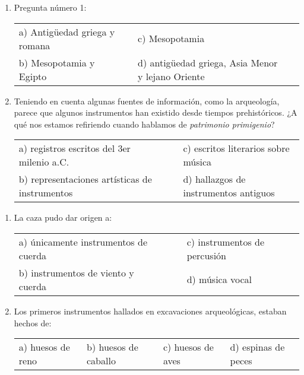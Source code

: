 \documentclass[letterpaper,12pt,notitlepage,spanish]{article}
\begin{document}
\begin{ejercicio}[]
	\begin{enumerate}[1.-]
%
% 
		\item
		Pregunta número 1:\par
%
%
	\begin{tabular}{llll}
		a) Antigüedad griega y romana & & c) Mesopotamia & \\
		b) Mesopotamia y Egipto & & d) antigüedad griega, Asia Menor y lejano Oriente
	\end{tabular}
%	
%
%
\item Teniendo en cuenta algunas fuentes de información, como la arqueología, parece que algunos instrumentos han existido desde tiempos prehistóricos. ¿A qué nos estamos refiriendo cuando hablamos de \textit{patrimonio primigenio}? \par
%
%
	\begin{tabular}{llll}
		a) registros escritos del 3er milenio a.C. & & & c) escritos literarios sobre música\\
		b) representaciones artísticas de instrumentos & & & d) hallazgos de instrumentos antiguos\\
	\end{tabular}
%
%
	\end{enumerate}
\end{ejercicio}
%
\begin{ejercicio}[]
	\begin{enumerate}[1.-]
%
%
		\item La caza pudo dar origen a: \par
%
%		
	\begin{tabular}{llll}
		a) únicamente instrumentos de cuerda & & & c) instrumentos de percusión\\
		b) instrumentos de viento y cuerda & & & d) música vocal\\
	\end{tabular}
%
%
%
		\item Los primeros instrumentos hallados en excavaciones arqueológicas, estaban hechos de:\par
%
%		
	\begin{tabular}{llll}
		a) huesos de reno & b) huesos de caballo & c) huesos de aves  & d) espinas de peces\\
%
%

	\end{tabular}
%
	\end{enumerate}
\end{ejercicio}
\end{document}
